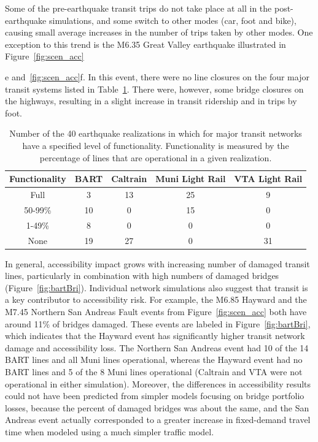 Some of the pre-earthquake transit trips do not take place at all in the post-earthquake simulations, and some switch to other modes (car, foot and bike), causing small average increases in the number of trips taken by other modes. One exception to this trend is the M6.35 Great Valley earthquake illustrated in Figure~\ref{fig:scen_acc}{e and~\ref{fig:scen_acc}{f}. In this event, there were no line closures on the four major transit systems listed in Table~\ref{tab:transit}. There were, however, some bridge closures on the highways, resulting in a slight increase in transit ridership and in trips by foot.

\begin{table}
\caption{Number of the 40 earthquake realizations in which for major transit networks have a specified level of functionality. Functionality is measured by the percentage of lines that are operational in a given realization. }
\centering
\begin{tabular}{c||c|c|c|c}
\textbf{Functionality}           & \textbf{BART} & \textbf{Caltrain} & \textbf{Muni Light Rail} & \textbf{VTA Light Rail}  \\
\hline
Full & 3 & 13 & 25 & 9\\
50-99\%  & 10 & 0 & 15 & 0\\
1-49\%  & 8 & 0 & 0 & 0\\
None & 19 & 27 & 0 & 31\\
\end{tabular}
\label{tab:transit}
\end{table}



In general, accessibility impact grows with increasing number of damaged transit lines, particularly in combination with high numbers of damaged bridges (Figure~\ref{fig:bartBri}). Individual network simulations also suggest that transit is a key contributor to accessibility risk. For example, the M6.85 Hayward and the M7.45 Northern San Andreas Fault events from Figure~\ref{fig:scen_acc} both have around 11\% of bridges damaged. These events are labeled in Figure~\ref{fig:bartBri}, which indicates that the Hayward event has significantly higher transit network damage and accessibility loss. The Northern San Andreas event had 10 of the 14 BART lines and all Muni lines operational, whereas the Hayward event had no BART lines and 5 of the 8 Muni lines operational (Caltrain and VTA were not operational in either simulation).  
Moreover, the differences in accessibility results could not have been predicted from simpler models focusing on bridge portfolio losses, because the percent of damaged bridges was about the same, and the San Andreas event actually corresponded to a greater increase in fixed-demand travel time when modeled using a much simpler traffic model.

}
